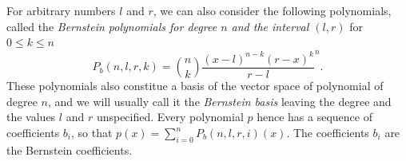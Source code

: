 \documentclass{mscs}
\begin{document}

For arbitrary numbers \(l\) and
\(r\), we can also consider the following polynomials, called
the {\em Bernstein polynomials for degree \(n\) and the interval
\((l,r)\)} for \(0 \leq k \leq n\)
\[P_b(n, l, r, k) = \binom{n}{k} \frac{(x-l)^{n-k}(r-x)^k}{r-l}^n.\]
These polynomials also constitue a basis of the vector space of polynomial
of degree \(n\), and we will usually call it the {\em Bernstein basis} leaving
the degree and the values \(l\) and \(r\) unspecified.
Every polynomial \(p\) hence has a sequence of coefficients
\(b_i\), so that \(p(x) = \sum_{i=0}^n P_b(n,l,r,i)(x)\).  The coefficients
\(b_i\) are the Bernstein coefficients.
\end{document}
